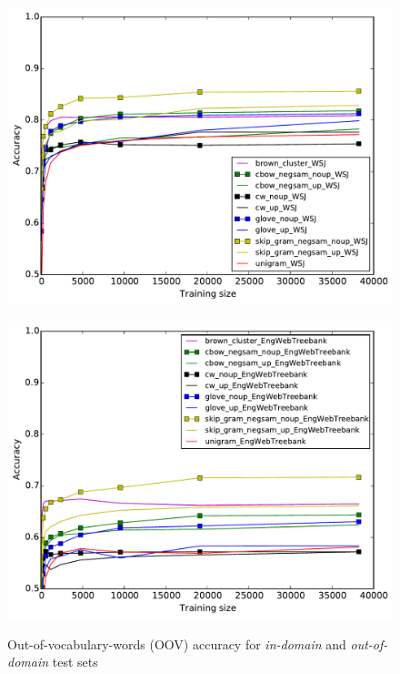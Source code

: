 \begin{figure}
\caption{Out-of-vocabulary-words (OOV) accuracy for \textit{in-domain} and \textit{out-of-domain} test sets}
\label{OOV} 
  \begin{minipage}[b]{7cm}
    	\includegraphics[scale=0.4]{plots/POS-OOV-IN}
    \label{POS-OOV-IN}	
  \end{minipage} 
  \begin{minipage}[b]{7cm}
    	\includegraphics[scale=0.4]{plots/POS-OOV-OUT}
    \label{POS-OOV-OUT}	

\end{minipage}
\end{figure}
